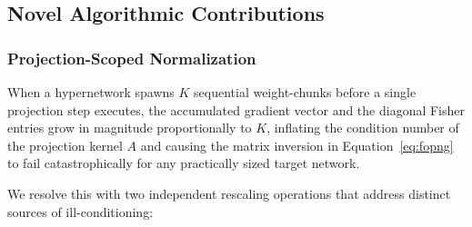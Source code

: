 \subsection{Novel Algorithmic Contributions}
\label{sec:novel}

\subsubsection{Projection-Scoped Normalization}
\label{sec:normalization}

When a hypernetwork spawns $K$ sequential weight-chunks before a single
projection step executes, the accumulated gradient vector and the diagonal
Fisher entries grow in magnitude proportionally to $K$, inflating the
condition number of the projection kernel $A$ and causing the
matrix inversion in Equation~\eqref{eq:fopng} to fail catastrophically for
any practically sized target network.

We resolve this with two independent rescaling operations that address
distinct sources of ill-conditioning:

